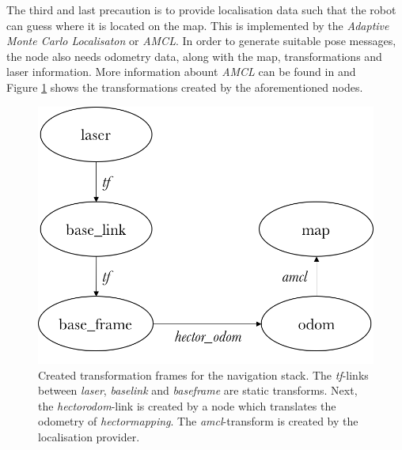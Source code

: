 \documentclass[conference,a4paper]{IEEEtran}
\begin{document}
The third and last precaution is to provide localisation data such that the robot can guess where it is located on the map. This is implemented by the \emph{Adaptive Monte Carlo Localisaton} or \emph{AMCL}. In order to generate suitable pose messages, the node also needs odometry data, along with the map, transformations and laser information. More information abount \emph{AMCL} can be found in \cite{Gerkey2016} and \cite{Thrun1999}\\

Figure \ref{fig:navstack_tf} shows the transformations created by the aforementioned nodes. 

\begin{figure}[!t]
    \includegraphics[width=\columnwidth]{navstack_tf}
    \centering
    \caption{Created transformation frames for the navigation stack. The \emph{tf}-links between \emph{laser}, \emph{base\textunderscore link} and \emph{base\textunderscore frame} are static transforms. Next, the \emph{hector\textunderscore odom}-link is created by a node which translates the odometry of \emph{hector\textunderscore mapping}. The \emph{amcl}-transform is created by the localisation provider.}
    \label{fig:navstack_tf}
\end{figure}
\end{document}
